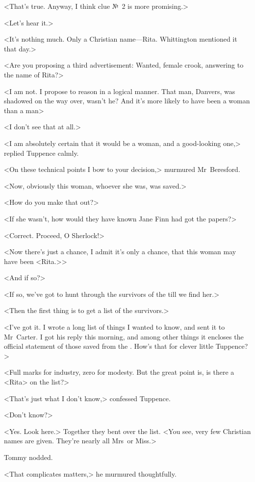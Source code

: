 <That's true. Anyway, I think clue №~2 is more promising.>

<Let's hear it.>

<It's nothing much. Only a Christian name—Rita. Whittington mentioned it that day.>

<Are you proposing a third advertisement: Wanted, female crook, answering to the name of Rita?>

<I am not. I propose to reason in a logical manner. That man, Danvers, was shadowed on the way over, wasn't he? And it's more likely to have been a woman than a man\longdash>

<I don't see that at all.>

<I am absolutely certain that it would be a woman, and a good-looking one,> replied Tuppence calmly.

<On these technical points I bow to your decision,> murmured Mr~Beresford.

<Now, obviously this woman, whoever she was, was saved.>

<How do you make that out?>

<If she wasn't, how would they have known Jane Finn had got the papers?>

<Correct. Proceed, O Sherlock!>

<Now there's just a chance, I admit it's only a chance, that this woman may have been <Rita.>>

<And if so?>

<If so, we've got to hunt through the survivors of the  till we find her.>

<Then the first thing is to get a list of the survivors.>

<I've got it. I wrote a long list of things I wanted to know, and sent it to Mr~Carter. I got his reply this morning, and among other things it encloses the official statement of those saved from the . How's that for clever little Tuppence?>

<Full marks for industry, zero for modesty. But the great point is, is there a <Rita> on the list?>

<That's just what I don't know,> confessed Tuppence.

<Don't know?>

<Yes. Look here.> Together they bent over the list. <You see, very few Christian names are given. They're nearly all Mrs~or Miss.>

Tommy nodded.

<That complicates matters,> he murmured thoughtfully.


